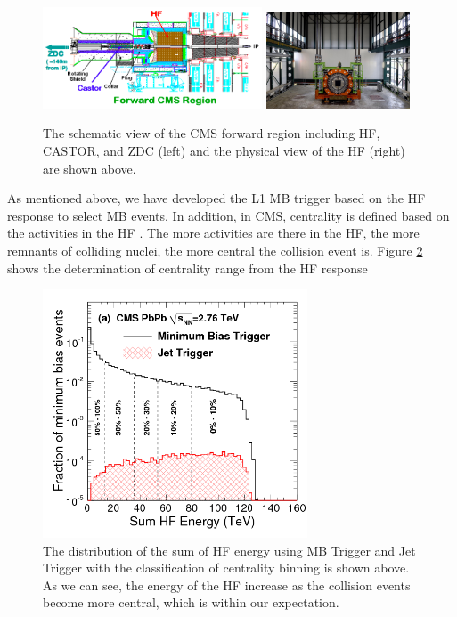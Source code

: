 \begin{figure}[hbtp]
\begin{center}
\includegraphics[width=0.58\textwidth]{Figures/Chapter3/CMSForwardRegion.png}
\includegraphics[width=0.38\textwidth]{Figures/Chapter3/HFReal.jpg}
\caption{The schematic view of the CMS forward region including HF, CASTOR, and ZDC (left) and the physical view of the HF (right) are shown above.}
\label{HFPic}
\end{center}
\end{figure} 

As mentioned above, we have developed the L1 MB trigger based on the HF response to select MB events. In addition, in CMS, centrality is defined based on the activities in the HF \cite{HFCentRef}. The more activities are there in the HF, the more remnants of colliding nuclei, the more central the collision event is. Figure \ref{HFCent} shows the determination of centrality range from the HF response 



\begin{figure}[hbtp]
\begin{center}
\includegraphics[width=0.70\textwidth]{Figures/Chapter3/HFCent.png}
\caption{The distribution of the sum of HF energy using MB Trigger and Jet Trigger with the classification of centrality binning is shown above. As we can see, the energy of the HF increase as the collision events become more central, which  is within our expectation.}
\label{HFCent}
\end{center}
\end{figure} 



